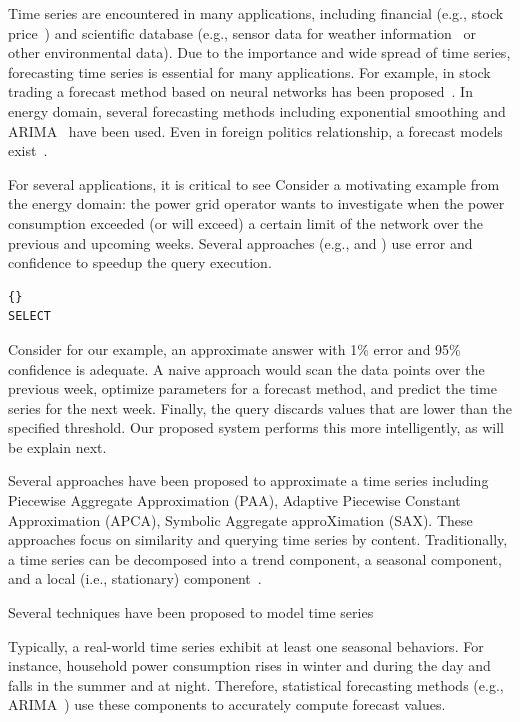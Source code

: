 
Time series are encountered in many applications, including financial (e.g., stock price~\cite{stock}) and scientific database (e.g.,
sensor data for weather information~\cite{arimaEng} or other environmental data).
Due to the importance and wide spread of time series,  forecasting time series is essential for  many applications. For example, in stock trading a forecast method based on  neural networks  has been proposed~\cite{stock}.
In energy domain, several forecasting methods including exponential smoothing \cite{} and ARIMA~\cite{tBOX76a} have been used.
Even in foreign politics relationship, a forecast models exist~\cite{iran}.

For several applications, it is critical to see 
Consider a motivating example from the energy domain: the power grid operator wants to investigate when the power consumption exceeded (or will exceed) a certain limit of the network  over the previous and upcoming weeks. Several approaches (e.g.,\cite{AG99} and \cite{KML10}) use error and confidence to speedup the query execution. 

\begin{verbatim}{}
SELECT 
\end{verbatim}

Consider for our example, an approximate answer with 1\% error  and 95\% confidence is adequate. A naive approach would scan the data points over the previous week, optimize parameters for a forecast method, and predict the time series for the next week. Finally, the query discards values that are lower than the specified threshold. Our proposed system performs this more intelligently, as will be explain next. 

Several approaches have been proposed to approximate a time series including Piecewise Aggregate Approximation (PAA), Adaptive Piecewise Constant Approximation (APCA),  Symbolic Aggregate approXimation (SAX). These approaches focus on similarity and querying time series by content.
Traditionally, a time series  can be decomposed into a trend component, a seasonal component, and a local (i.e., stationary) component~\cite{Decompose}. 

Several techniques have been proposed to model  time series 
 
Typically, a real-world time series  exhibit at least one  seasonal behaviors. For instance, household power consumption rises in winter and during the day and falls in the summer and at night.
Therefore, statistical  forecasting methods (e.g., ARIMA~\cite{tBOX76a}) use these components  to accurately compute forecast values. 	







